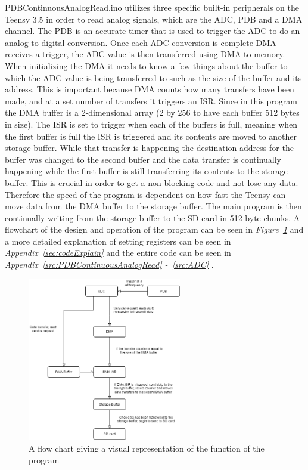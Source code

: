 PDBContinuousAnalogRead.ino utilizes three specific built-in peripherals on the Teensy 3.5 in order to read analog signals, which are the ADC, PDB and a DMA channel.
The PDB is an accurate timer that is used to trigger the ADC to do an analog to digital conversion.
Once each ADC conversion is complete DMA receives a trigger, the ADC value is then transferred using DMA to memory.
When initializing the DMA it needs to know a few things about the buffer to which the ADC value is being transferred to such as the size of the buffer and its address. 
This is important because DMA counts how many transfers have been made, and at a set number of transfers it triggers an ISR.
Since in this program the DMA buffer is a 2-dimensional array (2 by 256 to have each buffer 512 bytes in size).
The ISR is set to trigger when each of the buffers is full, meaning when the first buffer is full the ISR is triggered and its contents are moved to another storage buffer.
While that transfer is happening the destination address for the buffer was changed to the second buffer and the data transfer is continually happening while the first buffer is still transferring its contents to the storage buffer.
This is crucial in order to get a non-blocking code and not lose any data.
Therefore the speed of the program is dependent on how fast the Teensy can move data from the DMA buffer to the storage buffer.
The main program is then continually writing from the storage buffer to the SD card in 512-byte chunks.
A flowchart of the design and operation of the program can be seen in \textit{Figure~\ref{fig:CodeFlow}} and a more detailed explanation of setting registers can be seen in \textit{Appendix~\ref{sec:codeExplain}} and the entire code can be seen in \textit{Appendix~\ref{src:PDBContinuousAnalogRead} -~\ref{src:ADC}} .

\begin{figure}[h]
    \centering
    \includegraphics[width=0.60\textwidth]{graphics/flowChart.png}
    \caption{A flow chart giving a visual representation of the function of the program}
    \label{fig:CodeFlow}
\end{figure}

